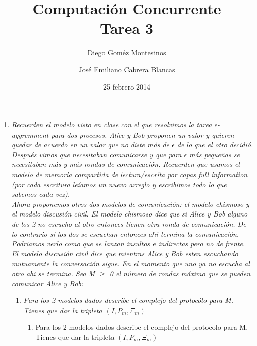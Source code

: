 \documentclass{article}
\title{Computación Concurrente \\ \Large{Tarea 3}}
\author{
  Diego Goméz Montesinos
  \and
  José Emiliano Cabrera Blancas
  }
\date{25 febrero 2014}
\begin{document}
\maketitle
\begin{enumerate}
\item{
    \textsl{
    Recuerden el modelo visto en clase con el que resolvimos la tarea
    $\epsilon$-aggremment para dos procesos. Alice y Bob proponen un valor y
    quieren quedar de acuerdo en un valor que no diste más de $\epsilon$ de lo
    que el otro decidió. Después vimos que necesitaban comunicarse y que para 
    $\epsilon$ más pequeñas se necesitaban más y más rondas de comunicación.
    Recuerden que usamos el modelo de memoria compartida de lectura/escrita por
    capas \textit{full information} (por cada escritura leíamos un nuevo
    arreglo y escribimos todo lo que sabemos cada vez).\\
    Ahora proponemos otros dos modelos de comunicación: el modelo chismoso y el
    modelo discusión civil. El modelo chismoso dice que si Alice y Bob alguno de
    los 2 no escucho al otro entonces tienen otra ronda de comunicación. De lo
    contrario si los dos se escuchan entonces ahi termina la comunicación.
    Podriamos verlo como que se lanzan insultos e indirectas pero no de frente.\\
    El modelo discusión civil dice que mientras Alice y Bob esten escuchando 
    mutuamente la conversación sigue. En el momento que uno ya no escucha al otro
    ahi se termina.
    Sea \textit{M} $≥$ 0 el número de rondas máximo que se pueden comunicar Alice
    y Bob:}

    \begin{enumerate}
      \item{\textsl{Para los 2 modelos dados describe el complejo del protocólo para M. 
        Tienes que dar la tripleta $(I,P_m,\Xi_m)$}}

    \begin{enumerate}
      \item{Para los 2 modelos dados describe el complejo del protocolo para M. 
        Tienes que dar la tripleta $(I,P_m,\Xi_m)$}\\\\
        

\end{enumerate}
\end{enumerate}}
\end{enumerate}
\end{document}
